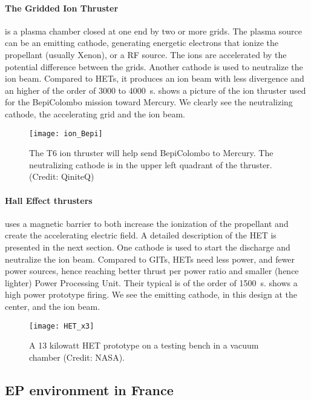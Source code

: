  
 \paragraph{The Gridded Ion Thruster} is a plasma chamber closed at one end by two or more grids.
 The plasma source can be an emitting cathode, generating energetic electrons that ionize the propellant (usually Xenon), or a \ac{RF} source.
 The ions are accelerated by the potential difference between the grids.
 Another cathode is used to neutralize the ion beam.
 Compared to \ac{HET}s, it produces an ion beam with less divergence and an higher \Isp of the order of 3000 to 4000~s.
  shows a picture of the ion thruster used for the BepiColombo mission toward Mercury.
 We clearly see the neutralizing cathode, the accelerating grid and the ion beam.
 
\begin{figure}[hbtp]
  \centering
  \texttt{[image: ion\_Bepi]}
  \caption{The T6 ion thruster will help send BepiColombo to Mercury. The neutralizing cathode is in the upper left quadrant of the thruster. (Credit\string: QiniteQ)}
  \label{fig-iongridded}
\end{figure}
 
 \paragraph{Hall Effect thrusters} uses a magnetic barrier to both increase the ionization of the propellant and create the accelerating electric field.
 A detailed description of the \ac{HET} is presented in the next section.
 One cathode is used to start the discharge and neutralize the ion beam.
 Compared to GITs, \ac{HET}s need less power, and fewer power sources, hence reaching better thrust per power ratio and smaller (hence lighter) Power Processing Unit.
 Their typical \Isp is of the order of 1500~s.
  shows a high power prototype firing.
 We see the emitting cathode, in this design at the center, and the ion beam.
 \begin{figure}[hbtp]
   \centering
   \texttt{[image: HET\_x3]}
   \caption{A 13 kilowatt \ac{HET} prototype on a testing bench in a vacuum chamber (Credit\string: NASA).  }
   \label{fig-13kWHET}
 \end{figure}
 
 
 \subsection*{\ac{EP} environment in France} \label{subsec-HET_thruster}
 
